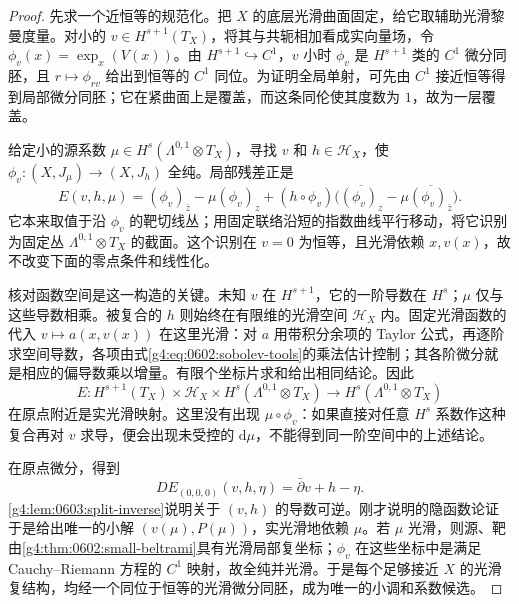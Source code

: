 \begin{proof}
	先求一个近恒等的规范化。把 \(X\) 的底层光滑曲面固定，给它取辅助光滑黎曼度量。对小的 \(v\in H^{s+1}(T_X)\)，将其与共轭相加看成实向量场，令 \(\phi_v(x)=\exp_x(V(x))\)。由 \(H^{s+1}\hookrightarrow C^1\)，\(v\) 小时 \(\phi_v\) 是 \(H^{s+1}\) 类的 \(C^1\) 微分同胚，且 \(r\mapsto\phi_{rv}\) 给出到恒等的 \(C^1\) 同位。为证明全局单射，可先由 \(C^1\) 接近恒等得到局部微分同胚；它在紧曲面上是覆盖，而这条同伦使其度数为 \(1\)，故为一层覆盖。

	给定小的源系数 \(\mu\in H^s(\Lambda^{0,1}\otimes T_X)\)，寻找 \(v\) 和 \(h\in\mathscr H_X\)，使 \(\phi_v:(X,J_\mu)\to(X,J_h)\) 全纯。局部残差正是
	\begin{equation}\label{g4:eq:0603:slice-equation}
		E(v,h,\mu)
		=(\phi_v)_{\overline z}-\mu(\phi_v)_z
		+(h\circ\phi_v)
		\bigl(\overline{(\phi_v)_z}
		-\mu\overline{(\phi_v)_{\overline z}}\bigr).
	\end{equation}
	它本来取值于沿 \(\phi_v\) 的靶切线丛；用固定联络沿短的指数曲线平行移动，将它识别为固定丛 \(\Lambda^{0,1}\otimes T_X\) 的截面。这个识别在 \(v=0\) 为恒等，且光滑依赖 \(x,v(x)\)，故不改变下面的零点条件和线性化。

	核对函数空间是这一构造的关键。未知 \(v\) 在 \(H^{s+1}\)，它的一阶导数在 \(H^s\)；\(\mu\) 仅与这些导数相乘。被复合的 \(h\) 则始终在有限维的光滑空间 \(\mathscr H_X\) 内。固定光滑函数的代入 \(v\mapsto a(x,v(x))\) 在这里光滑：对 \(a\) 用带积分余项的 Taylor 公式，再逐阶求空间导数，各项由式\eqref{g4:eq:0602:sobolev-tools}的乘法估计控制；其各阶微分就是相应的偏导数乘以增量。有限个坐标片求和给出相同结论。因此
	\[
		E:H^{s+1}(T_X)\times\mathscr H_X\times H^s(\Lambda^{0,1}\otimes T_X)
		\longrightarrow H^s(\Lambda^{0,1}\otimes T_X)
	\]
	在原点附近是实光滑映射。这里没有出现 \(\mu\circ\phi_v\)：如果直接对任意 \(H^s\) 系数作这种复合再对 \(v\) 求导，便会出现未受控的 \(\mathrm{d}\mu\)，不能得到同一阶空间中的上述结论。

	在原点微分，得到
	\[
		D E_{(0,0,0)}(v,h,\eta)=\bar\partial v+h-\eta.
	\]
	\cref{g4:lem:0603:split-inverse}说明关于 \((v,h)\) 的导数可逆。刚才说明的隐函数论证于是给出唯一的小解 \((v(\mu),P(\mu))\)，实光滑地依赖 \(\mu\)。若 \(\mu\) 光滑，则源、靶由\cref{g4:thm:0602:small-beltrami}具有光滑局部复坐标；\(\phi_v\) 在这些坐标中是满足 Cauchy--Riemann 方程的 \(C^1\) 映射，故全纯并光滑。于是每个足够接近 \(X\) 的光滑复结构，均经一个同位于恒等的光滑微分同胚，成为唯一的小调和系数候选。


\end{proof}

